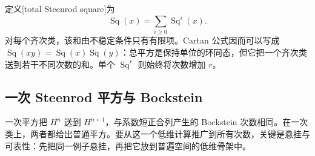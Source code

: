 定义[total Steenrod square]为
\[
	\operatorname{Sq}(x)=\sum_{i\ge0}\operatorname{Sq}^i(x).
\]
对每个齐次类，该和由不稳定条件只有有限项。Cartan 公式因而可以写成 \(\operatorname{Sq}(xy)=\operatorname{Sq}(x)\operatorname{Sq}(y)\)：总平方是保持单位的环同态，但它把一个齐次类送到若干不同次数的和。单个 \(\operatorname{Sq}^r\) 则始终将次数增加 \(r\)。

\subsection{一次 Steenrod 平方与 Bockstein}
\label{g2:subsec:1303:02}

一次平方把 \(H^n\) 送到 \(H^{n+1}\)，与系数短正合列产生的 Bockstein 次数相同。在一次类上，两者都给出普通平方。要从这一个低维计算推广到所有次数，关键是悬挂与可表性：先把同一例子悬挂，再把它放到普遍空间的低维骨架中。

